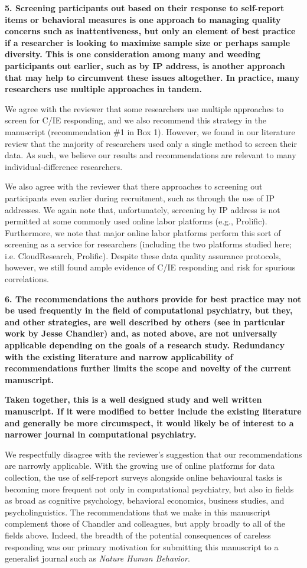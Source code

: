 \documentclass[a4paper,notitlepage,12pt]{article}
\begin{document}
\textbf{5. Screening participants out based on their response to self-report items or behavioral measures is one approach to managing quality concerns such as inattentiveness, but only an element of best practice if a researcher is looking to maximize sample size or perhaps sample diversity. This is one consideration among many and weeding participants out earlier, such as by IP address, is another approach that may help to circumvent these issues altogether. In practice, many researchers use multiple approaches in tandem.}

We agree with the reviewer that some researchers use multiple approaches to screen for C/IE responding, and we also recommend this strategy in the manuscript (recommendation \#1 in Box 1). However, we found in our literature review that the majority of researchers used only a single method to screen their data. As such, we believe our results and recommendations are relevant to many individual-difference researchers. 

We also agree with the reviewer that there approaches to screening out participants even earlier during recruitment, such as through the use of IP addresses. We again note that, unfortunately,  screening by IP address is not permitted at some commonly used online labor platforms (e.g., Prolific). Furthermore, we note that major online labor platforms perform this sort of screening as a service for researchers (including the two platforms studied here; i.e. CloudResearch, Prolific). Despite these data quality assurance protocols, however, we still found ample evidence of C/IE responding and risk for spurious correlations.

\textbf{6. The recommendations the authors provide for best practice may not be used frequently in the field of computational psychiatry, but they, and other strategies, are well described by others (see in particular work by Jesse Chandler) and, as noted above, are not universally applicable depending on the goals of a research study. Redundancy with the existing literature and narrow applicability of recommendations further limits the scope and novelty of the current manuscript.}

\textbf{Taken together, this is a well designed study and well written manuscript. If it were modified to better include the existing literature and generally be more circumspect, it would likely be of interest to a narrower journal in computational psychiatry.}

We respectfully disagree with the reviewer's suggestion that our recommendations are narrowly applicable. With the growing use of online platforms for data collection, the use of self-report surveys alongside online behavioural tasks is becoming more frequent not only in computational psychiatry, but also in fields as broad as cognitive psychology, behavioral economics, business studies, and psycholinguistics. The recommendations that we make in this manuscript complement those of Chandler and colleagues, but apply broadly to all of the fields above. Indeed, the breadth of the potential consequences of careless responding was our primary motivation for submitting this manuscript to a generalist journal such as \textit{Nature Human Behavior}.
\end{document}
